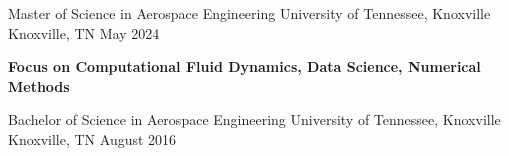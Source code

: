 
\begin{cventries}
  \cventry
    {Master of Science in Aerospace Engineering} %
    {University of Tennessee, Knoxville} %
    {Knoxville, TN} %
    {May 2024} %
    {
      \begin{cvitems} %
         \item {\textbf{Focus on Computational Fluid Dynamics, Data Science, Numerical Methods}}
      \end{cvitems}
    }

  \cventry
    {Bachelor of Science in Aerospace Engineering} %
    {University of Tennessee, Knoxville } %
    {Knoxville, TN} %
    {August 2016} %
    {
      \begin{cvitems} %
      \end{cvitems}
    }
\end{cventries}
